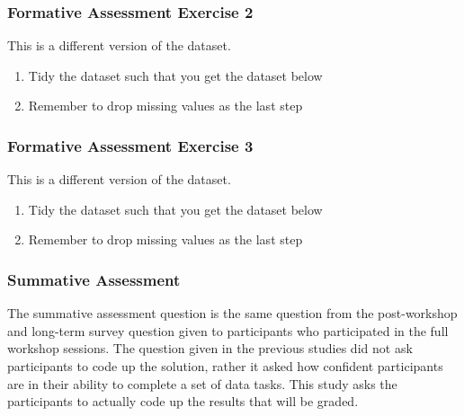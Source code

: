 \documentclass[040-assessment.tex]{subfiles}
\begin{document}
\subsubsection{Formative Assessment Exercise 2}
    \begin{displayquote}

        This is a different version of the  dataset.

        \begin{enumerate}
            \item Tidy the dataset such that you get the dataset below
            \item Remember to drop missing values as the last step
        \end{enumerate}

    \end{displayquote}

\subsubsection{Formative Assessment Exercise 3}

    \begin{displayquote}

        This is a different version of the  dataset.

        \begin{enumerate}
            \item Tidy the dataset such that you get the dataset below
            \item Remember to drop missing values as the last step
        \end{enumerate}

    \end{displayquote}

\subsubsection{Summative Assessment}

    The summative assessment question is the same question from the post-workshop and long-term survey question
    given to participants who participated in the full workshop sessions.
    The question given in the previous studies did not ask participants to code up the solution,
    rather it asked how confident participants are in their ability to complete a set of data tasks.
    This study asks the participants to actually code up the results that will be graded.
\end{document}
